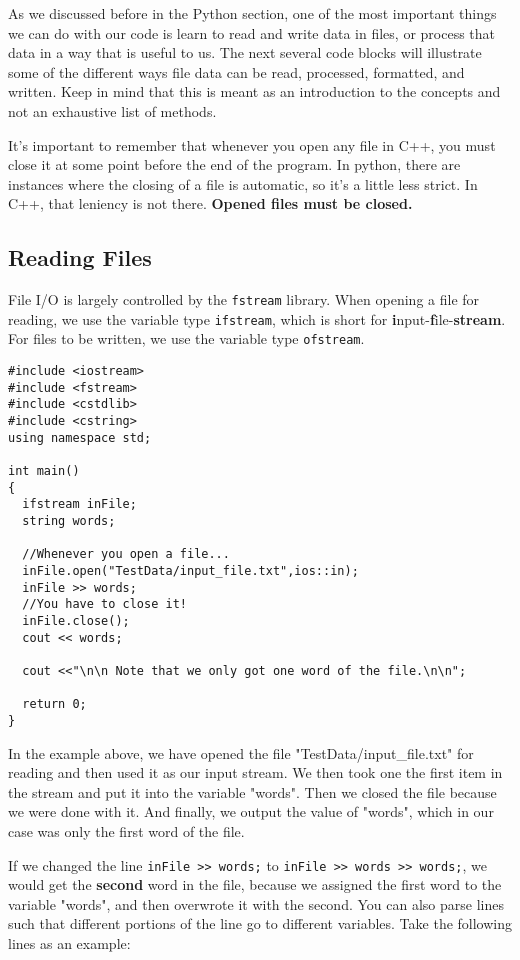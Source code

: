 As we discussed before in the Python section, one of the most important things we can do with our code is learn to read and write data in files, or process that data in a way that is useful to us.  The next several code blocks will illustrate some of the different ways file data can be read, processed, formatted, and written.
Keep in mind that this is meant as an introduction to the concepts and not an exhaustive list of methods.

It's important to remember that whenever you open any file in C++, you must close it at some point before the end of the program.  In python, there are instances where the closing of a file is automatic, so it's a little less strict.  In C++, that leniency is not there.  \textbf{Opened files must be closed.}

\subsection{Reading Files}
File I/O is largely controlled by the \texttt{fstream} library.  When opening a file for reading, we use the variable type \texttt{ifstream}, which is short for \textbf{i}nput-\textbf{f}ile-\textbf{stream}.  For files to be written, we use the variable type \texttt{ofstream}.

\begin{verbatim}
#include <iostream>
#include <fstream>
#include <cstdlib>
#include <cstring>
using namespace std;

int main()
{
  ifstream inFile;
  string words;
  
  //Whenever you open a file...
  inFile.open("TestData/input_file.txt",ios::in);
  inFile >> words;
  //You have to close it!
  inFile.close();
  cout << words;
  
  cout <<"\n\n Note that we only got one word of the file.\n\n";

  return 0;
}
\end{verbatim}

In the example above, we have opened the file "TestData/input\_file.txt" for reading and then used it as our input stream.  We then took one the first item in the stream and put it into the variable "words".  Then we closed the file because we were done with it.  And finally, we output the value of "words", which in our case was only the first word of the file.

If we changed the line \texttt{inFile >> words;} to \texttt{inFile >> words >> words;}, we would get the \textbf{second} word in the file, because we assigned the first word to the variable "words", and then overwrote it with the second.  You can also parse lines such that different portions of the line go to different variables.  Take the following lines as an example:

